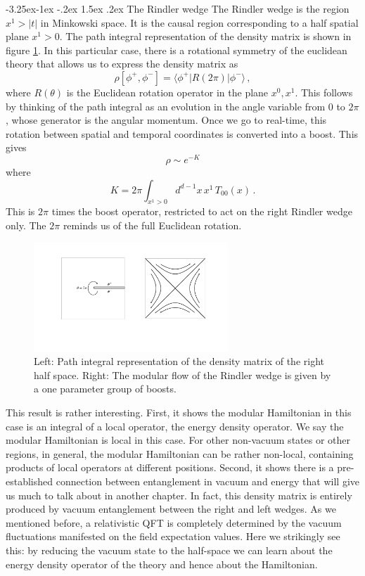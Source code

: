 \documentclass[11pt]{article}
\makeatletter
\renewcommand\subsection{\@startsection{subsection}{2}{\z@}%
                                   {-3.25ex\@plus -1ex \@minus -.2ex}%
                                     {1.5ex \@plus .2ex}%
                                     {\normalfont\bfseries}}
\numberwithin{equation}{section}
\newcommand{\be}{\begin{equation}}
\newcommand{\ee}{\end{equation}}
\makeatother
\begin{document}
\subsection{The Rindler wedge}
\label{rw}
The Rindler wedge is the region $x^1>|t|$ in Minkowski space. It is the causal region corresponding to a half spatial plane $x^1>0$. The path integral representation of the density matrix is shown in figure \ref{rindler}. In this particular case, there is a rotational symmetry of the euclidean theory that allows us to express the density matrix as  
\be
\rho[\phi^+,\phi^-]=\langle \phi^+| R(2\pi) |\phi^- \rangle\,,
\ee
where $R(\theta)$ is the Euclidean rotation operator in the plane $x^0,x^1$. 
This follows by thinking of the path integral as an evolution in the angle variable from $0$ to $2\pi$, whose generator is the angular momentum.  
Once we go to real-time, this rotation between spatial and temporal coordinates is converted into a boost. This gives
\be
\rho\sim e^{- K}\label{pico}
\ee
where
\be
K=2 \pi \int_{x^1>0} d^{d-1}x\,  x^1\, T_{00}(x)\,.\label{pico1}
\ee
This is $2 \pi$ times the boost operator, restricted to act on the right Rindler wedge only. The $2\pi$ reminds us of the full Euclidean rotation.  

\begin{figure}[t]
\begin{center}  
\includegraphics[width=0.65\textwidth]{rindler.pdf}
\captionsetup{width=0.9\textwidth}
\caption{Left: Path integral representation of the density matrix of the right half space. Right: The modular flow of the Rindler wedge is given by a one parameter group of boosts.}
\label{rindler}
\end{center}  
\end{figure}

This result is rather interesting. First, it shows the modular Hamiltonian in this case is an integral of a local operator, the energy density operator. We say the modular Hamiltonian is local in this case. For other non-vacuum states or other regions, in general, the modular Hamiltonian can be rather non-local, containing products of local operators at different positions. Second, it shows there is a pre-established connection between entanglement in vacuum and energy that will give us much to talk about in another chapter. In fact, this density matrix is entirely produced by vacuum entanglement between the right and left wedges. As we mentioned before, a relativistic QFT is completely determined by the vacuum fluctuations manifested on the field expectation values. Here we strikingly see this: by reducing the vacuum state to the half-space we can learn about the energy density operator of the theory and hence about the Hamiltonian.      
\end{document}
